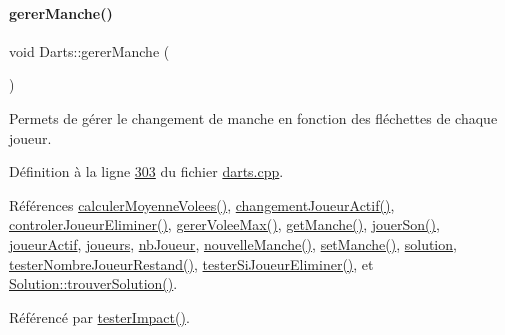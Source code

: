 \paragraph{\texorpdfstring{gerer\+Manche()}{gererManche()}}
{\footnotesize\ttfamily void Darts\+::gerer\+Manche (\begin{DoxyParamCaption}{ }\end{DoxyParamCaption})\hspace{0.3cm}{\ttfamily [private]}}



Permets de gérer le changement de manche en fonction des fléchettes de chaque joueur. 



Définition à la ligne \hyperlink{darts_8cpp_source_l00303}{303} du fichier \hyperlink{darts_8cpp_source}{darts.\+cpp}.



Références \hyperlink{darts_8cpp_source_l00387}{calculer\+Moyenne\+Volees()}, \hyperlink{class_darts_afeba952f29a901b4ebac86cfc7a4733f}{changement\+Joueur\+Actif()}, \hyperlink{darts_8cpp_source_l00349}{controler\+Joueur\+Eliminer()}, \hyperlink{darts_8cpp_source_l00409}{gerer\+Volee\+Max()}, \hyperlink{darts_8cpp_source_l00044}{get\+Manche()}, \hyperlink{class_darts_a87995841c66fc321b63c28fa8a786347}{jouer\+Son()}, \hyperlink{darts_8h_source_l00076}{joueur\+Actif}, \hyperlink{darts_8h_source_l00073}{joueurs}, \hyperlink{darts_8h_source_l00075}{nb\+Joueur}, \hyperlink{class_darts_ace3f99f5381399b0b86e5b8192d6fd71}{nouvelle\+Manche()}, \hyperlink{darts_8cpp_source_l00132}{set\+Manche()}, \hyperlink{darts_8h_source_l00072}{solution}, \hyperlink{darts_8cpp_source_l00453}{tester\+Nombre\+Joueur\+Restand()}, \hyperlink{darts_8cpp_source_l00372}{tester\+Si\+Joueur\+Eliminer()}, et \hyperlink{solution_8cpp_source_l00296}{Solution\+::trouver\+Solution()}.



Référencé par \hyperlink{darts_8cpp_source_l00246}{tester\+Impact()}.


